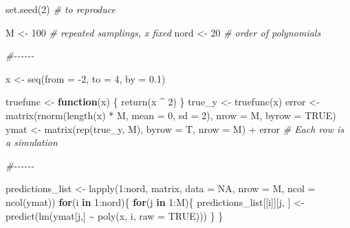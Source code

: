\documentclass[
]{article}
\newenvironment{Shaded}{\begin{snugshade}}{\end{snugshade}}
\newcommand{\AttributeTok}[1]{\textcolor[rgb]{0.77,0.63,0.00}{#1}}
\newcommand{\CommentTok}[1]{\textcolor[rgb]{0.56,0.35,0.01}{\textit{#1}}}
\newcommand{\ConstantTok}[1]{\textcolor[rgb]{0.00,0.00,0.00}{#1}}
\newcommand{\ControlFlowTok}[1]{\textcolor[rgb]{0.13,0.29,0.53}{\textbf{#1}}}
\newcommand{\DecValTok}[1]{\textcolor[rgb]{0.00,0.00,0.81}{#1}}
\newcommand{\FloatTok}[1]{\textcolor[rgb]{0.00,0.00,0.81}{#1}}
\newcommand{\FunctionTok}[1]{\textcolor[rgb]{0.00,0.00,0.00}{#1}}
\newcommand{\NormalTok}[1]{#1}
\newcommand{\OtherTok}[1]{\textcolor[rgb]{0.56,0.35,0.01}{#1}}
\newcommand{\SpecialCharTok}[1]{\textcolor[rgb]{0.00,0.00,0.00}{#1}}
\begin{document}
\begin{Shaded}
\begin{Highlighting}[]
\FunctionTok{set.seed}\NormalTok{(}\DecValTok{2}\NormalTok{) }\CommentTok{\# to reproduce}

\NormalTok{M }\OtherTok{\textless{}{-}} \DecValTok{100} \CommentTok{\# repeated samplings, x fixed}
\NormalTok{nord }\OtherTok{\textless{}{-}} \DecValTok{20} \CommentTok{\# order of polynomials}

\CommentTok{\#{-}{-}{-}{-}{-}{-}}

\NormalTok{x }\OtherTok{\textless{}{-}} \FunctionTok{seq}\NormalTok{(}\AttributeTok{from =} \SpecialCharTok{{-}}\DecValTok{2}\NormalTok{, }\AttributeTok{to =} \DecValTok{4}\NormalTok{, }\AttributeTok{by =} \FloatTok{0.1}\NormalTok{)}

\NormalTok{truefunc }\OtherTok{\textless{}{-}} \ControlFlowTok{function}\NormalTok{(x) \{}
  \FunctionTok{return}\NormalTok{(x }\SpecialCharTok{\^{}} \DecValTok{2}\NormalTok{)}
\NormalTok{\}}
\NormalTok{true\_y }\OtherTok{\textless{}{-}} \FunctionTok{truefunc}\NormalTok{(x)}
\NormalTok{error }\OtherTok{\textless{}{-}} \FunctionTok{matrix}\NormalTok{(}\FunctionTok{rnorm}\NormalTok{(}\FunctionTok{length}\NormalTok{(x) }\SpecialCharTok{*}\NormalTok{ M, }\AttributeTok{mean =} \DecValTok{0}\NormalTok{, }\AttributeTok{sd =} \DecValTok{2}\NormalTok{),}
                \AttributeTok{nrow =}\NormalTok{ M,}
                \AttributeTok{byrow =} \ConstantTok{TRUE}\NormalTok{)}
\NormalTok{ymat }\OtherTok{\textless{}{-}} \FunctionTok{matrix}\NormalTok{(}\FunctionTok{rep}\NormalTok{(true\_y, M), }\AttributeTok{byrow =}\NormalTok{ T, }\AttributeTok{nrow =}\NormalTok{ M) }\SpecialCharTok{+}\NormalTok{ error  }\CommentTok{\# Each row is a simulation}

\CommentTok{\#{-}{-}{-}{-}{-}{-}}

\NormalTok{predictions\_list }\OtherTok{\textless{}{-}} \FunctionTok{lapply}\NormalTok{(}\DecValTok{1}\SpecialCharTok{:}\NormalTok{nord, matrix, }\AttributeTok{data =} \ConstantTok{NA}\NormalTok{, }\AttributeTok{nrow =}\NormalTok{ M, }\AttributeTok{ncol =} \FunctionTok{ncol}\NormalTok{(ymat))}
\ControlFlowTok{for}\NormalTok{(i }\ControlFlowTok{in} \DecValTok{1}\SpecialCharTok{:}\NormalTok{nord)\{}
  \ControlFlowTok{for}\NormalTok{(j }\ControlFlowTok{in} \DecValTok{1}\SpecialCharTok{:}\NormalTok{M)\{}
\NormalTok{    predictions\_list[[i]][j, ] }\OtherTok{\textless{}{-}} \FunctionTok{predict}\NormalTok{(}\FunctionTok{lm}\NormalTok{(ymat[j,] }\SpecialCharTok{\textasciitilde{}} \FunctionTok{poly}\NormalTok{(x, i, }\AttributeTok{raw =} \ConstantTok{TRUE}\NormalTok{)))}
\NormalTok{  \}}
\NormalTok{\}}


\end{Highlighting}
\end{Shaded}
\end{document}

